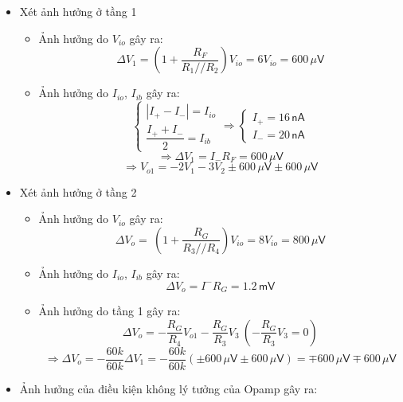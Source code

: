 \begin{itemize}[label=-]
	\item Xét ảnh hưởng ở tầng 1
		\begin{itemize}[label=+]
			\item Ảnh hưởng do $V_{io}$ gây ra:
			\[ \Delta V_{1} = \left( 1 + \dfrac{R_{F}}{R_{1} // R_{2}} \right) V_{io} = 6V_{io} = 600\,\mu\textsf{V} \]
			\item Ảnh hưởng do $I_{io}$, $I_{ib}$ gây ra:
			\[
			\left\{
			\begin{matrix}
				| I_{+} - I_{-} | = I_{io} 	\\[4pt]
				\dfrac{I_{+} + I_{-}}{2} = I_{ib}
			\end{matrix}
			\right.
			\Rightarrow
			\left\{
			\begin{matrix}
				I_{+} = 16\,\textsf{nA}	\\[4pt]
				I_{-} = 20\,\textsf{nA}
			\end{matrix}
			\right.
			\]
			\[
			\Rightarrow \Delta V_{1} = I_{-}R_{F} = 600\,\mu\textsf{V}
			\]
			\[
			\Rightarrow V_{o1} = -2V_{1} - 3V_{2} \pm600\,\mu\textsf{V} \pm 600\,\mu\textsf{V}
			\]
		\end{itemize}
	\item Xét ảnh hưởng ở tầng 2
		\begin{itemize}[label=+]
			\item Ảnh hưởng do $V_{io}$ gây ra:
			\[
			{{\Delta V}}_o=\ \left(1+\frac{R_G}{R_3 //  R_4}\right)V_{io}=8V_{io}=800\,\mu\textsf{V}
			\]
			
			\item Ảnh hưởng do $I_{io}$, $I_{ib}$ gây ra:
			\[
			{{\Delta V}}_o=I^-R_G=1.2\,\textsf{mV}
			\]
			
			\item Ảnh hưởng do tầng 1 gây ra:
			\[
			{{\Delta V}}_o=-\frac{R_G}{R_4}V_{o1}-\frac{R_G}{R_3}V_3\ \left(-\frac{R_G}{R_3}V_3=0\right)
			\]
			\[
			\Longrightarrow{{\Delta V}}_o=-\frac{60k}{60k}{{\Delta V}}_1=-\frac{60k}{60k} \left(\pm600\,\mu\textsf{V}\pm600\,\mu\textsf{V}\right)=\mp600\,\mu\textsf{V}\mp600\,\mu\textsf{V}
			\]
		\end{itemize}
	\item Ảnh hưởng của điều kiện không lý tưởng của Opamp gây ra:
	\begin{center}
	\end{center}
	

\end{itemize}
